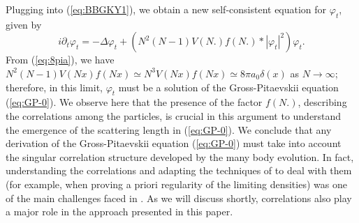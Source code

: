 \documentclass[11pt,a4paper]{article}
\begin{document}
Plugging into (\ref{eq:BBGKY1}), we obtain a new self-consistent equation for $\varphi_t$,  given by
\begin{equation}\label{eq:gp-mod0} i\partial_t \varphi_t = -\Delta \varphi_t
+ \left(N^2 (N-1) V(N.) f(N.) * |\varphi_t|^2 \right) \varphi_t.
\end{equation}
{F}rom (\ref{eq:8pia}), we have $N^2 (N-1) V(Nx) f(Nx) \simeq N^3 V(Nx) f(Nx) \simeq 8\pi a_0 \delta (x)$ as $N \to \infty$; therefore, in this limit, $\varphi_t$ must be a solution of the Gross-Pitaevskii equation (\ref{eq:GP-0}). We observe here that the presence of the factor $f(N.)$, describing the correlations among the particles, is crucial in this argument to understand the emergence of the scattering length in  (\ref{eq:GP-0}). We conclude that any derivation of the Gross-Pitaevskii equation (\ref{eq:GP-0}) must take into account the singular correlation structure developed by the many body evolution. In fact, understanding the correlations and adapting the techniques of \cite{S,EY,ES} to deal with them (for example, when proving a priori regularity of the limiting densities) was one of the main challenges faced in \cite{ESY0,ESY1,ESY2,ESY3,ESY4}. As we will discuss shortly, correlations also play a major role in the approach presented in this paper. 

\bigskip
\end{document}
